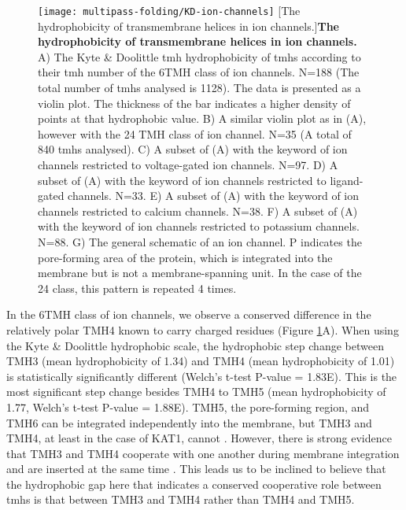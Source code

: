 \begin{figure}[!ht]
\centering
\texttt{[image: multipass-folding/KD-ion-channels]}
		[The hydrophobicity of transmembrane helices in ion channels.]{\textbf{The hydrophobicity of transmembrane helices in ion channels.}
    A) The Kyte \& Doolittle \gls{tmh} hydrophobicity of \gls{tmh}s according to their \gls{tmh} number of the 6TMH class of ion channels.
    N=188 (The total number of \gls{tmh}s analysed is 1128).
    The data is presented as a violin plot.
    The thickness of the bar indicates a higher density of points at that hydrophobic value.
    B) A similar violin plot as in (A), however with the 24 TMH class of ion channel.
    N=35 (A total of 840 \gls{tmh}s analysed).
    C) A subset of (A) with the keyword of ion channels restricted to voltage\--gated ion channels.
    N=97.
    D) A subset of (A) with the keyword of ion channels restricted to ligand\--gated channels.
    N=33.
    E) A subset of (A) with the keyword of ion channels restricted to calcium channels.
    N=38.
    F) A subset of (A) with the keyword of ion channels restricted to potassium channels.
    N=88.
    G) The general schematic of an ion channel.
    P indicates the pore\--forming area of the protein, which is integrated into the membrane but is not a membrane\--spanning unit.
    In the case of the 24 class, this pattern is repeated 4 times.
    }

\label{fig:KD-ion-channels}

\end{figure}

In the 6TMH class of ion channels, we observe a conserved difference in the relatively polar TMH4 known to carry charged residues (Figure \ref{fig:KD-ion-channels}A).
When using the Kyte \& Doolittle hydrophobic scale, the hydrophobic step change between TMH3 (mean hydrophobicity of 1.34) and TMH4 (mean hydrophobicity of 1.01) is statistically significantly different (Welch's t\--test P\--value = 1.83E).
This is the most significant step change besides TMH4 to TMH5 (mean hydrophobicity of 1.77, Welch's t\--test P\--value = 1.88E).
TMH5, the pore\--forming region, and TMH6 can be integrated independently into the membrane, but TMH3 and TMH4, at least in the case of KAT1, cannot \cite{Sato2002}.
However, there is strong evidence that TMH3 and TMH4 cooperate with one another during membrane integration and are inserted at the same time \cite{Sato2002, Sato2003, Zhang2007, Cymer2015}.
This leads us to be inclined to believe that the hydrophobic gap here that indicates a conserved cooperative role between \gls{tmh}s is that between TMH3 and TMH4 rather than TMH4 and TMH5.



